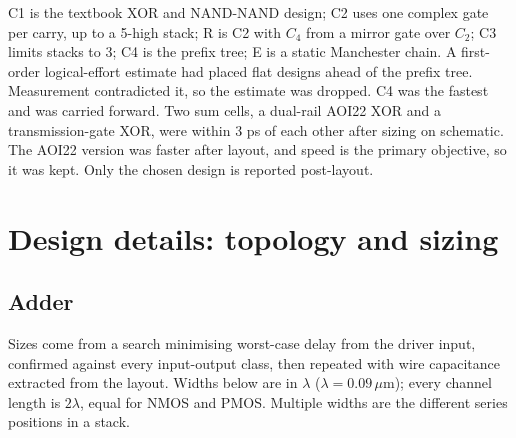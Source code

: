 \documentclass[10pt,a4paper]{article}
\begin{document}
C1 is the textbook XOR and NAND-NAND design; C2 uses one complex gate per carry, up to a 5-high stack; R is C2 with $C_4$ from a mirror gate over $C_2$; C3 limits stacks to 3; C4 is the prefix tree; E is a static Manchester chain. A first-order logical-effort estimate had placed flat designs ahead of the prefix tree. Measurement contradicted it, so the estimate was dropped. C4 was the fastest and was carried forward. Two sum cells, a dual-rail AOI22 XOR and a transmission-gate XOR, were within 3 ps of each other after sizing on schematic. The AOI22 version was faster after layout, and speed is the primary objective, so it was kept. Only the chosen design is reported post-layout.

\section{Design details: topology and sizing}
\subsection{Adder}
Sizes come from a search minimising worst-case delay from the driver input, confirmed against every input-output class, then repeated with wire capacitance extracted from the layout. Widths below are in $\lambda$ ($\lambda=0.09\,\mu$m); every channel length is $2\lambda$, equal for NMOS and PMOS. Multiple widths are the different series positions in a stack.
\end{document}
